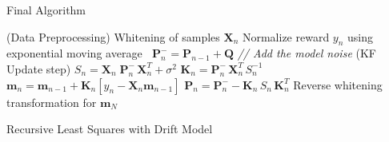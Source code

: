 \documentclass[navbarinfooter, 12pt]{sdqbeamer}
\begin{document}

\begingroup
\footnotesize
\begin{frame}{Final Algorithm}
\begin{algorithm}[H]
\renewcommand{\algorithmcfname}{Algorithm}
\DontPrintSemicolon
{
  \Begin(Data Preprocessing)
  {
  Whitening of samples $\mathbf{X}_n$ \;
  Normalize reward $y_n$ using exponential moving average \;
  }
  $~$ \;
  $\mathbf{P}_n^- = \mathbf{P}_{n-1} + \mathbf{Q}$
  \textit{  // Add the model noise}\;
  \Begin(KF Update step)
  {
    $S_n = \mathbf{X}_n \; \mathbf{P}_n^- \, \mathbf{X}_n^T + \sigma^2$ \;
    $\textbf{K}_n = \textbf{P}_{n}^{-} \, \textbf{X}^T_n \, S_n^{-1}$ \;
    $\textbf{m}_n = \textbf{m}_{n-1} + \textbf{K}_n [y_n - \textbf{X}_n \textbf{m}_{n-1}]$ \;
    $\textbf{P}_n = \textbf{P}_{n}^{-} - \textbf{K}_n \, S_n \, \textbf{K}_n^T $ \;
  }
}
Reverse whitening transformation for $\mathbf{m}_N$ \;
\caption{Recursive Least Squares with Drift Model}
\end{algorithm}
\end{frame}
\endgroup
\end{document}
